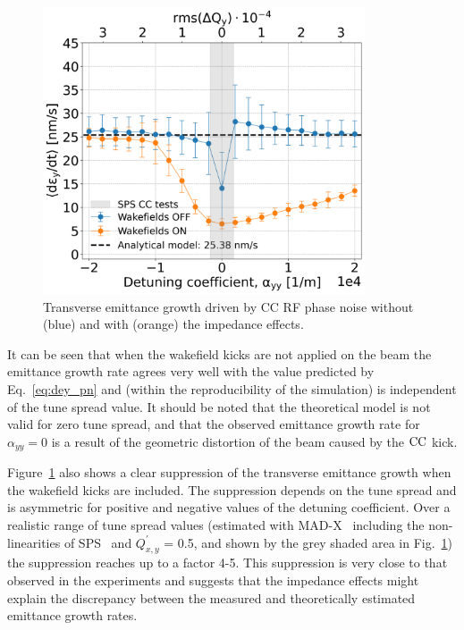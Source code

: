 \begin{figure}[!h] %
    \centering         
    \includegraphics[width=0.85\textwidth]{images/Ch7/deyRates_final_2018_PN_sps_270GeV_PN1e-8_400MHz_y-plane_QpxQpy5e-1_6D_Nb5e5_intensity3e10_ayyScan_wakesON_vs_OFF_vs_TuneSpreadvsExpectedSPS.png}
        \caption{Transverse emittance growth driven by CC RF phase noise without (blue) and with (orange) the impedance effects.}
        \label{fig:MD_2018_impedance_simulations}
 \end{figure}

It can be seen that when the wakefield kicks are not applied on the beam the emittance growth rate agrees very well with the value predicted by Eq.~\eqref{eq:dey_pn} and (within the reproducibility of the simulation) is independent of the tune spread value. It should be noted that the theoretical model is not valid for zero tune spread, and that the observed emittance growth rate for $\alpha_{yy} = 0$ is a result of the geometric distortion of the beam caused by the ${\mathrm{CC}}$ kick.

Figure~\ref{fig:MD_2018_impedance_simulations} also shows a clear suppression of the transverse emittance growth when the wakefield kicks are included. The suppression depends on the tune spread and is asymmetric for positive and negative values of the detuning coefficient. Over a realistic range of tune spread values (estimated with MAD-X~\cite{madx} including the non-linearities of SPS~\cite{Carlà:2664976, Alekou:2640326} and $Q^\prime_{x,y}$ = 0.5, and shown by the grey shaded area in Fig.~\ref{fig:MD_2018_impedance_simulations}) the suppression reaches up to a factor 4-5. This suppression is very close to that observed in the experiments and suggests that the impedance effects might explain the discrepancy between the measured and theoretically estimated emittance growth rates.

